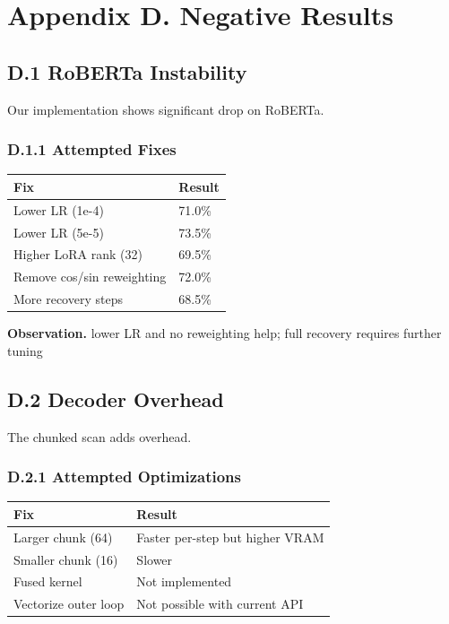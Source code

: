 
\section{Appendix D. Negative Results}

\subsection{D.1 RoBERTa Instability}

Our implementation shows significant drop on RoBERTa.

\subsubsection{D.1.1 Attempted Fixes}

\begin{table}[H]
\centering
\small
\begin{tabular}{ll}
\toprule
\textbf{Fix} & \textbf{Result} \\
\midrule
Lower LR (1e-4) & 71.0\% \\
Lower LR (5e-5) & 73.5\% \\
Higher LoRA rank (32) & 69.5\% \\
Remove cos/sin reweighting & 72.0\% \\
More recovery steps & 68.5\% \\
\bottomrule
\end{tabular}
\end{table}

\textbf{Observation.} lower LR and no reweighting help; full recovery requires further tuning

\subsection{D.2 Decoder Overhead}

The chunked scan adds overhead.

\subsubsection{D.2.1 Attempted Optimizations}

\begin{table}[H]
\centering
\small
\begin{tabular}{ll}
\toprule
\textbf{Fix} & \textbf{Result} \\
\midrule
Larger chunk (64) & Faster per-step but higher VRAM \\
Smaller chunk (16) & Slower \\
Fused kernel & Not implemented \\
Vectorize outer loop & Not possible with current API \\
\bottomrule
\end{tabular}
\end{table}

